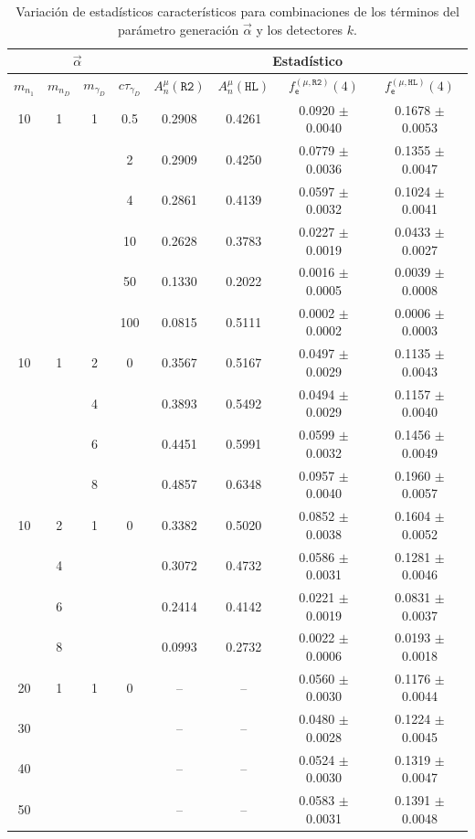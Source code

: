 \begin{table}[!t]
\centering
\footnotesize
\begin{tabular}{|cccc|cccc|}
\toprule
\multicolumn{4}{|c|}{$\vec{\alpha}$} & \multicolumn{4}{|c|}{Estadístico} \\
\hline
$m_{n_1}$ & $m_{n_D}$ & $m_{\gamma_D}$ & $c\tau_{\gamma_D}$ & 
$A_n^\mu(\texttt{R2})$ & 
$A_n^\mu(\texttt{HL})$ & 
$f^{(\mu, \texttt{R2})}_\textsf{e} (4)$ & 
$f^{(\mu, \texttt{HL})}_\textsf{e} (4)$ \\
\midrule
10 & 1 & 1 & 0.5 & 0.2908 & 0.4261 & 0.0920 $\pm$ 0.0040 & 0.1678 $\pm$ 0.0053\\
& & & 2 & 0.2909 & 0.4250 & 0.0779 $\pm$ 0.0036 & 0.1355 $\pm$ 0.0047 \\
& & & 4 & 0.2861 & 0.4139 & 0.0597 $\pm$ 0.0032 & 0.1024 $\pm$ 0.0041\\
& & & 10 & 0.2628 & 0.3783 & 0.0227 $\pm$ 0.0019 & 0.0433 $\pm$ 0.0027\\
& & & 50 & 0.1330 & 0.2022 & 0.0016 $\pm$ 0.0005 & 0.0039 $\pm$ 0.0008\\
& & & 100 & 0.0815 & 0.5111 & 0.0002 $\pm$ 0.0002 & 0.0006 $\pm$ 0.0003\\
\midrule
10 & 1 & 2 & 0 & 0.3567 & 0.5167 & 0.0497 $\pm$ 0.0029 & 0.1135 $\pm$ 0.0043 \\
& & 4 & & 0.3893 & 0.5492 & 0.0494 $\pm$ 0.0029 & 0.1157 $\pm$ 0.0040 \\
& & 6 & & 0.4451 & 0.5991 & 0.0599 $\pm$ 0.0032 & 0.1456 $\pm$ 0.0049\\
& & 8 & & 0.4857 & 0.6348 & 0.0957 $\pm$ 0.0040 & 0.1960 $\pm$ 0.0057\\
\midrule
10 & 2 & 1 & 0 & 0.3382 & 0.5020 & 0.0852 $\pm$ 0.0038 & 0.1604 $\pm$ 0.0052\\
& 4 & & & 0.3072 & 0.4732 & 0.0586 $\pm$ 0.0031 & 0.1281 $\pm$ 0.0046 \\
& 6 & & & 0.2414 & 0.4142 & 0.0221 $\pm$ 0.0019 & 0.0831 $\pm$ 0.0037\\
& 8 & & & 0.0993 & 0.2732 & 0.0022 $\pm$ 0.0006 & 0.0193 $\pm$ 0.0018\\
\midrule
20 & 1 & 1 & 0 & -- & -- & 0.0560 $\pm$ 0.0030 & 0.1176 $\pm$ 0.0044 \\
30 & & & &  --  & -- & 0.0480 $\pm$ 0.0028 & 0.1224 $\pm$ 0.0045\\
40 & & & & -- & -- &  0.0524 $\pm$ 0.0030 &  0.1319 $\pm$ 0.0047 \\
50 & & & & -- & -- & 0.0583 $\pm$ 0.0031 & 0.1391 $\pm$ 0.0048 \\
\bottomrule 
\end{tabular}
\caption{Variación de estadísticos característicos para combinaciones de los términos del parámetro generación $\vec{\alpha}$ y los detectores $k$.}
\label{Numero_de_Entradas}
\end{table}

